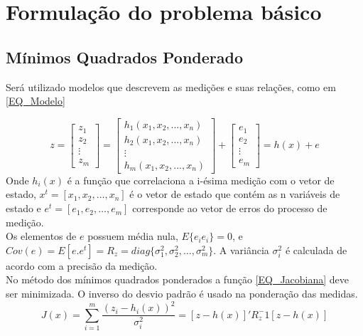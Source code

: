 \section{Formula\c{c}\~ao do problema b\'asico}
\subsection{Mínimos Quadrados Ponderado}
Será utilizado modelos que descrevem as medições e suas relações, como em \ref{EQ_Modelo}

\begin{equation}
    z = \left[ 
    \begin{matrix} 
        z_1 \\
        z_2 \\
        \vdots \\
        z_m
    \end{matrix} \right]=\left[ 
    \begin{matrix} 
        h_1(x_1,x_2,...,x_n) \\
        h_2(x_1,x_2,...,x_n) \\
        \vdots \\
        h_m(x_1,x_2,...,x_n)
    \end{matrix} \right]+\left[ 
    \begin{matrix} 
        e_1 \\
        e_2 \\
        \vdots \\
        e_m
    \end{matrix} \right] = h(x) + e
    \label{EQ_Modelo}
\end{equation}
Onde $h_i(x)$ é a função que correlaciona a i-ésima medição com o vetor de estado, $x^t = [x_1, x_2,\hdots, x_n ]$ é o vetor de estado que contém as n variáveis de estado e $e^t = [e_1, e_2,\hdots, e_m ]$ corresponde ao vetor de erros do processo de medição.\\
Os elementos de $e$ possuem média nula, $E\{e_i e_i\} = 0$, e $Cov(e) = E[e.e^t] = R_z = diag\{\sigma_1^2, \sigma_2^2, \hdots, \sigma_m^2\}$. A variância $\sigma_i^2$ é calculada de acordo com a precisão da medição.\\
No método dos mínimos quadrados ponderados a função \ref{EQ_Jacobiana} deve ser minimizada. O inverso do desvio padrão é usado na ponderação das medidas. \cite{castro}
\begin{equation}
    J(x) = \sum_{i=1}^{m} \frac{(z_i - h_i(x))^2}{\sigma_i^2} = [z-h(x)]'R_z^-1[z-h(x)]
    \label{EQ_Jacobiana}
\end{equation}
